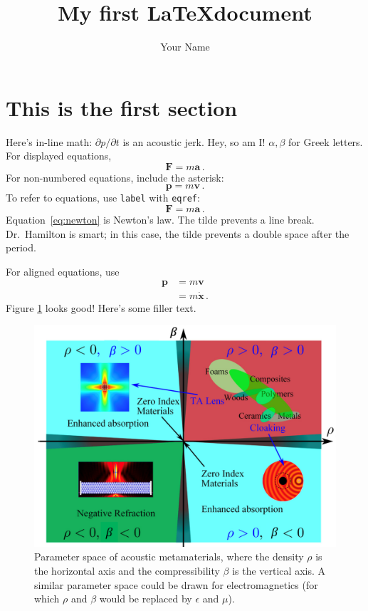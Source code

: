 \documentclass[12pt]{article}
\title{My first \LaTeX \space document}
\author{Your Name}
\renewcommand{\vec}[1]{\mathbf{#1}} %
\begin{document}
\maketitle

\section{This is the first section}
Here's in-line math: \(\partial p/\partial t\) is an acoustic jerk. Hey, so am I! \(\alpha, \beta\) for Greek letters. For displayed equations,
\begin{equation}
\vec{F} = m\vec{a}\,.
\end{equation}
For non-numbered equations, include the asterisk: 
\begin{equation*}
\vec{p} = m\vec{v}\,.
\end{equation*}
To refer to equations, use \texttt{label} with \texttt{eqref}:
\begin{equation}\label{eq:newton}
\vec{F} = m\vec{a}\,.
\end{equation}
Equation~\eqref{eq:newton} is Newton's law. The tilde prevents a line break. Dr.~Hamilton is smart; in this case, the tilde prevents a double space after the period. 

For aligned equations, use  
\begin{align*}
\vec{p} &= m\vec{v}\\
&= m\dot{\vec{x}}\,.
\end{align*}
Figure \ref{fig:ashby} looks good! Here's some filler text.
\lipsum
\begin{figure}%
\centering\includegraphics[width=0.5\linewidth]{fig/ashby}
\caption{Parameter space of acoustic metamaterials, where the density \(\rho\) is the horizontal axis and the compressibility \(\beta\) is the vertical axis. A similar parameter space could be drawn for electromagnetics (for which \(\rho\) and \(\beta\) would be replaced by \(\epsilon\) and \(\mu\)).} \label{fig:ashby}
\end{figure}
\end{document}
